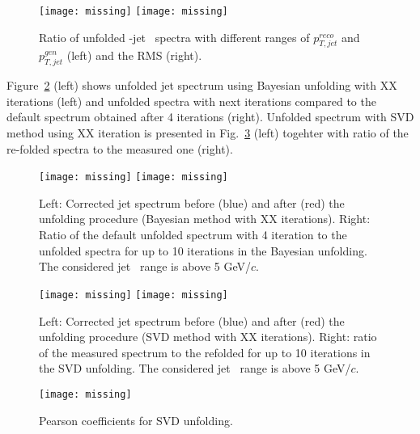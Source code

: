 \begin{figure}[bth]
\centering
\texttt{[image: missing]}
\texttt{[image: missing]}
\caption{Ratio of unfolded \Dzero-jet \pt\ spectra with different ranges of $p_{T,jet}^{reco}$ and $p_{T,jet}^{gen}$  (left) and the RMS (right).}
\label{fig:UnfSpec_pPb_Dzero_ranges_max30}
\end{figure}


Figure~\ref{fig:UnfSpec_pPb_Dzero_reg4} (left) shows unfolded jet \pt spectrum using Bayesian unfolding with {\color{red} XX} iterations (left) and unfolded spectra with next iterations compared to the default spectrum obtained after 4 iterations (right).
Unfolded spectrum with SVD method using {\color{red} XX} iteration is presented in Fig.~\ref{fig:UnfSpec_pPb_Dzero_SVD} (left) togehter with ratio of the re-folded spectra to the measured one (right).

\begin{figure}[bth]
\centering
\texttt{[image: missing]}
\texttt{[image: missing]}
\caption{Left: Corrected jet \pt spectrum before (blue) and after (red) the unfolding procedure (Bayesian method with {\color{red} XX} iterations). Right: Ratio of the default unfolded spectrum with 4 iteration to the unfolded spectra for up to 10 iterations in the Bayesian unfolding. The considered jet \pt\ range is above 5 GeV/$c$.}
\label{fig:UnfSpec_pPb_Dzero_reg4}
\end{figure}

\begin{figure}[bth]
\centering
\texttt{[image: missing]}
\texttt{[image: missing]}
\caption{Left: Corrected jet \pt spectrum before (blue) and after (red) the unfolding procedure (SVD method with {\color{red} XX} iterations). Right: ratio of the measured spectrum to the refolded for up to 10 iterations in the SVD unfolding. The considered jet \pt\ range is above 5 GeV/$c$.}
\label{fig:UnfSpec_pPb_Dzero_SVD}
\end{figure}


\begin{figure}[bth]
\centering
\texttt{[image: missing]}
\caption{Pearson coefficients for SVD unfolding.}
\label{fig:unfPearson_pPb_Dzero_SVD}
\end{figure}


